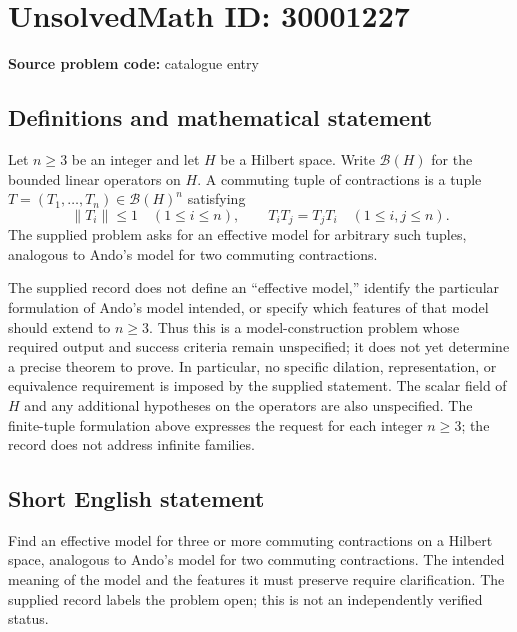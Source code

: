 \documentclass[11pt]{article}
\begin{document}
\section*{UnsolvedMath ID: 30001227}
\textbf{Source problem code:} catalogue entry
\subsection{Definitions and mathematical statement}
Let \(n\geq 3\) be an integer and let \(H\) be a Hilbert space. Write \(\mathcal B(H)\) for the bounded linear operators on \(H\). A commuting tuple of contractions is a tuple \(T=(T_1,\ldots,T_n)\in\mathcal B(H)^n\) satisfying
\[
\|T_i\|\leq 1\quad(1\leq i\leq n),\qquad T_iT_j=T_jT_i\quad(1\leq i,j\leq n).
\]
The supplied problem asks for an effective model for arbitrary such tuples, analogous to Ando's model for two commuting contractions.

The supplied record does not define an ``effective model,'' identify the particular formulation of Ando's model intended, or specify which features of that model should extend to \(n\geq3\). Thus this is a model-construction problem whose required output and success criteria remain unspecified; it does not yet determine a precise theorem to prove. In particular, no specific dilation, representation, or equivalence requirement is imposed by the supplied statement. The scalar field of \(H\) and any additional hypotheses on the operators are also unspecified. The finite-tuple formulation above expresses the request for each integer \(n\geq3\); the record does not address infinite families.
\subsection{Short English statement}
Find an effective model for three or more commuting contractions on a Hilbert space, analogous to Ando's model for two commuting contractions. The intended meaning of the model and the features it must preserve require clarification. The supplied record labels the problem open; this is not an independently verified status.
\end{document}
